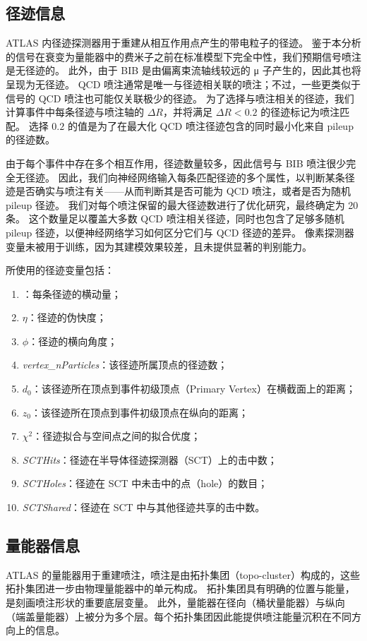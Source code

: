 \subsection{径迹信息}
ATLAS 内径迹探测器用于重建从相互作用点产生的带电粒子的径迹。
鉴于本分析的信号在衰变为量能器中的费米子之前在标准模型下完全中性，我们预期信号喷注是无径迹的。
此外，由于 BIB 是由偏离束流轴线较远的 μ 子产生的，因此其也将呈现为无径迹。
QCD 喷注通常是唯一与径迹相关联的喷注；不过，一些更类似于信号的 QCD 喷注也可能仅关联极少的径迹。
为了选择与喷注相关的径迹，我们计算事件中每条径迹与喷注轴的 $\Delta R$，并将满足 $\Delta R < 0.2$ 的径迹标记为喷注匹配。
选择 $0.2$ 的值是为了在最大化 QCD 喷注径迹包含的同时最小化来自 pileup 的径迹数。

由于每个事件中存在多个相互作用，径迹数量较多，因此信号与 BIB 喷注很少完全无径迹。
因此，我们向神经网络输入每条匹配径迹的多个属性，以判断某条径迹是否确实与喷注有关——从而判断其是否可能为 QCD 喷注，或者是否为随机 pileup 径迹。
我们对每个喷注保留的最大径迹数进行了优化研究，最终确定为 20 条。
这个数量足以覆盖大多数 QCD 喷注相关径迹，同时也包含了足够多随机 pileup 径迹，以便神经网络学习如何区分它们与 QCD 径迹的差异。
像素探测器变量未被用于训练，因为其建模效果较差，且未提供显著的判别能力。

所使用的径迹变量包括：
\begin{enumerate}
      \item \pt：每条径迹的横动量；
      \item $\eta$：径迹的伪快度；
      \item $\phi$：径迹的横向角度；
      \item \textit{vertex\_nParticles}：该径迹所属顶点的径迹数；
      \item $d_0$：该径迹所在顶点到事件初级顶点（Primary Vertex）在横截面上的距离；
      \item $z_0$：该径迹所在顶点到事件初级顶点在纵向的距离；
      \item $\chi^2$：径迹拟合与空间点之间的拟合优度；
      \item \textit{SCTHits}：径迹在半导体径迹探测器（SCT）上的击中数；
      \item \textit{SCTHoles}：径迹在 SCT 中未击中的点（hole）的数目；
      \item \textit{SCTShared}：径迹在 SCT 中与其他径迹共享的击中数。
\end{enumerate}

\subsection{量能器信息}
ATLAS 的量能器用于重建喷注，喷注是由拓扑集团（topo-cluster）构成的，这些拓扑集团进一步由物理量能器中的单元构成。
拓扑集团具有明确的位置与能量，是刻画喷注形状的重要底层变量。
此外，量能器在径向（桶状量能器）与纵向（端盖量能器）上被分为多个层。每个拓扑集团因此能提供喷注能量沉积在不同方向上的信息。

